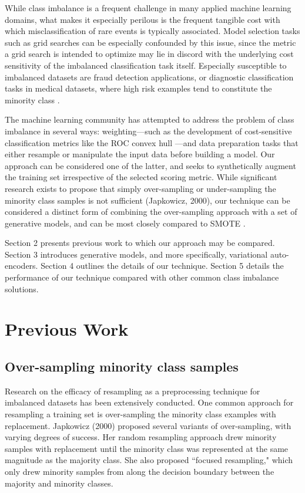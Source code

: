 \documentclass[twoside,11pt]{article}
\begin{document}
While class imbalance is a frequent challenge in many applied machine learning domains, what makes it especially perilous is the frequent tangible cost with which misclassification of rare events is typically associated. Model selection tasks such as grid searches can be especially confounded by this issue, since the metric a grid search is intended to optimize may lie in discord with the underlying cost sensitivity of the imbalanced classification task itself. Especially susceptible to imbalanced datasets are fraud detection applications, or diagnostic classification tasks in medical datasets, where high risk examples tend to constitute the minority class \citep{rahman2013addressing}.

The machine learning community has attempted to address the problem of class imbalance in several ways: weighting---such as the development of cost-sensitive classification metrics like the ROC convex hull \citep{provost2001robust}---and data preparation tasks that either resample or manipulate the input data before building a model. Our approach can be considered one of the latter, and seeks to synthetically augment the training set irrespective of the selected scoring metric. While significant research exists to propose that simply over-sampling or under-sampling the minority class samples is not sufficient (Japkowicz, 2000), our technique can be considered a distinct form of combining the over-sampling approach with a set of generative models, and can be most closely compared to SMOTE \citep{chawla2002smote}.

Section 2 presents previous work to which our approach may be compared. Section 3 introduces generative models, and more specifically, variational auto-encoders. Section 4 outlines the details of our technique. Section 5 details the performance of our technique compared with other common class imbalance solutions. \\

\section{Previous Work}
\subsection{Over-sampling minority class samples}

Research on the efficacy of resampling as a preprocessing technique for imbalanced datasets has been extensively conducted. One common approach for resampling a training set is over-sampling the minority class examples with replacement. Japkowicz (2000) proposed several variants of over-sampling, with varying degrees of success. Her random resampling approach drew minority samples with replacement until the minority class was represented at the same magnitude as the majority class. She also proposed ``focused resampling," which only drew minority samples from along the decision boundary between the majority and minority classes. 
\end{document}
